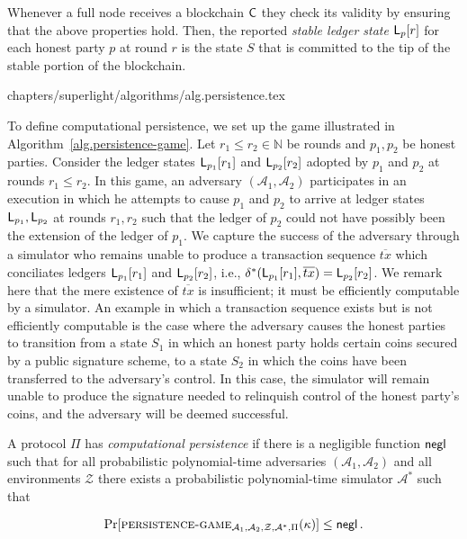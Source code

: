 Whenever a full node receives a blockchain $\mathsf{C}$ they check its validity by
ensuring that the above properties hold. Then, the reported \emph{stable ledger
state} $\mathsf{L}_{p}[r]$ for each honest party $p$ at round $r$ is the state $S$
that is committed to the tip of the stable portion of the blockchain.

{chapters/superlight/algorithms/alg.persistence.tex}

To define computational persistence, we set up the game illustrated in
Algorithm~\ref{alg.persistence-game}.
Let
$r_1 \leq r_2 \in \mathbb{N}$ be rounds and $p_1, p_2$ be honest parties.
Consider the ledger states $\mathsf{L}_{p_1}[r_1]$ and $\mathsf{L}_{p_2}[r_2]$
adopted by $p_1$ and $p_2$ at rounds $r_1 \leq r_2$.
In this game, an adversary
$(\mathcal{A}_1, \mathcal{A}_2)$ participates in an execution in which he
attempts to cause $p_1$ and $p_2$ to arrive at ledger states
$\mathsf{L}_{p_1}, \mathsf{L}_{p_2}$ at rounds $r_1, r_2$ such that the ledger of
$p_2$ could not have possibly been the
extension of the ledger of $p_1$. We capture the success of the adversary
through a simulator who remains unable to produce a transaction sequence
$\overline{tx}$ which conciliates ledgers $\mathsf{L}_{p_1}[r_1]$ and
$\mathsf{L}_{p_2}[r_2]$, i.e.,
$\delta^*(\mathsf{L}_{p_1}[r_1], \overline{tx}) = \mathsf{L}_{p_2}[r_2]$. We remark
here that the mere existence of $\overline{tx}$ is insufficient; it must be
efficiently computable by a simulator. An example in which a transaction
sequence exists but is not efficiently computable is the case where the
adversary causes the honest parties to transition from a state $S_1$ in which
an honest party holds certain coins secured by a public signature scheme, to
a state $S_2$ in which the coins have been transferred to the adversary's
control. In this case, the simulator will remain unable to produce the signature
needed to relinquish control of the honest party's coins, and the adversary will
be deemed successful.

\begin{definition}
  A protocol $\Pi$ has \emph{computational persistence} if there is a negligible
  function $\mathsf{negl}$ such that for all probabilistic
  polynomial-time adversaries $(\mathcal{A}_1, \mathcal{A}_2)$ and all environments $\mathcal{Z}$
  there exists a probabilistic
  polynomial-time simulator $\mathcal{A}^*$ such that

  \[
  \Pr[\textsc{persistence}\textsc{-}\textsc{game}_{\mathcal{A}_1,\mathcal{A}_2,\mathcal{Z},\mathcal{A}^*,\Pi}(\kappa)]
  \leq \mathsf{negl}
  \,.
  \]
\end{definition}

